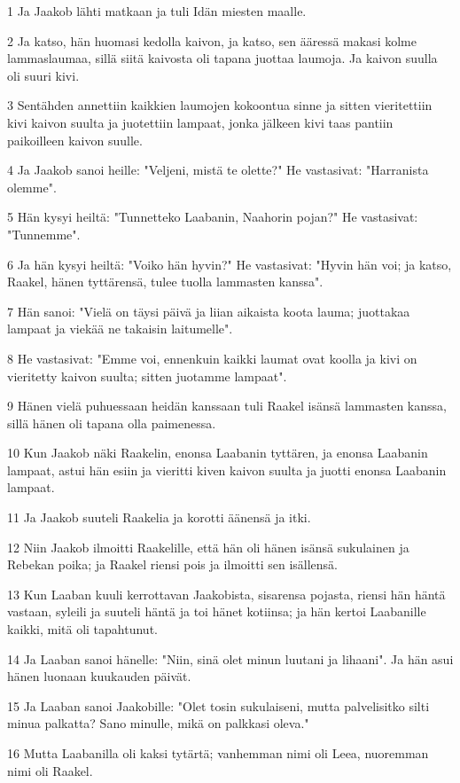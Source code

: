 \par 1 Ja Jaakob lähti matkaan ja tuli Idän miesten maalle.
\par 2 Ja katso, hän huomasi kedolla kaivon, ja katso, sen ääressä makasi kolme lammaslaumaa, sillä siitä kaivosta oli tapana juottaa laumoja. Ja kaivon suulla oli suuri kivi.
\par 3 Sentähden annettiin kaikkien laumojen kokoontua sinne ja sitten vieritettiin kivi kaivon suulta ja juotettiin lampaat, jonka jälkeen kivi taas pantiin paikoilleen kaivon suulle.
\par 4 Ja Jaakob sanoi heille: "Veljeni, mistä te olette?" He vastasivat: "Harranista olemme".
\par 5 Hän kysyi heiltä: "Tunnetteko Laabanin, Naahorin pojan?" He vastasivat: "Tunnemme".
\par 6 Ja hän kysyi heiltä: "Voiko hän hyvin?" He vastasivat: "Hyvin hän voi; ja katso, Raakel, hänen tyttärensä, tulee tuolla lammasten kanssa".
\par 7 Hän sanoi: "Vielä on täysi päivä ja liian aikaista koota lauma; juottakaa lampaat ja viekää ne takaisin laitumelle".
\par 8 He vastasivat: "Emme voi, ennenkuin kaikki laumat ovat koolla ja kivi on vieritetty kaivon suulta; sitten juotamme lampaat".
\par 9 Hänen vielä puhuessaan heidän kanssaan tuli Raakel isänsä lammasten kanssa, sillä hänen oli tapana olla paimenessa.
\par 10 Kun Jaakob näki Raakelin, enonsa Laabanin tyttären, ja enonsa Laabanin lampaat, astui hän esiin ja vieritti kiven kaivon suulta ja juotti enonsa Laabanin lampaat.
\par 11 Ja Jaakob suuteli Raakelia ja korotti äänensä ja itki.
\par 12 Niin Jaakob ilmoitti Raakelille, että hän oli hänen isänsä sukulainen ja Rebekan poika; ja Raakel riensi pois ja ilmoitti sen isällensä.
\par 13 Kun Laaban kuuli kerrottavan Jaakobista, sisarensa pojasta, riensi hän häntä vastaan, syleili ja suuteli häntä ja toi hänet kotiinsa; ja hän kertoi Laabanille kaikki, mitä oli tapahtunut.
\par 14 Ja Laaban sanoi hänelle: "Niin, sinä olet minun luutani ja lihaani". Ja hän asui hänen luonaan kuukauden päivät.
\par 15 Ja Laaban sanoi Jaakobille: "Olet tosin sukulaiseni, mutta palvelisitko silti minua palkatta? Sano minulle, mikä on palkkasi oleva."
\par 16 Mutta Laabanilla oli kaksi tytärtä; vanhemman nimi oli Leea, nuoremman nimi oli Raakel.
